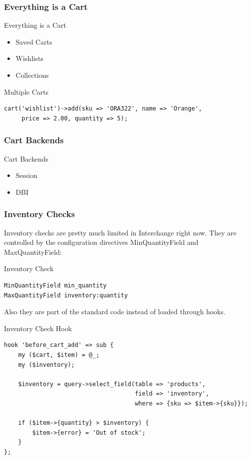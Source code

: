\subsubsection{Everything is a Cart}
\begin{frame}{Everything is a Cart}
\begin{itemize}
\item Saved Carts
\item Wishlists
\item Collections
\end{itemize}
\end{frame}

\begin{frame}[fragile]{Multiple Carts}
\begin{lstlisting}
cart('wishlist')->add(sku => 'ORA322', name => 'Orange',
     price => 2.00, quantity => 5);

\end{lstlisting}
\end{frame}

\subsubsection{Cart Backends}
\begin{frame}{Cart Backends}
\begin{itemize}
\item Session
\item DBI
\end{itemize}
\end{frame}

\subsubsection{Inventory Checks}
Inventory checks are pretty much limited in Interchange right now.
They are controlled by the configuration directives MinQuantityField
and MaxQuantityField:
\begin{frame}[fragile]{Inventory Check}
\begin{lstlisting}
MinQuantityField min_quantity
MaxQuantityField inventory:quantity 
\end{lstlisting}
\end{frame}
Also they are part of the standard code instead of loaded through
hooks.

\begin{frame}[fragile]{Inventory Check Hook}
\begin{lstlisting}
hook 'before_cart_add' => sub {
    my ($cart, $item) = @_;
    my ($inventory);

    $inventory = query->select_field(table => 'products',
                                     field => 'inventory',
                                     where => {sku => $item->{sku}});
				     
    if ($item->{quantity} > $inventory) {
        $item->{error} = 'Out of stock';
    }
};
\end{lstlisting}
\end{frame}

